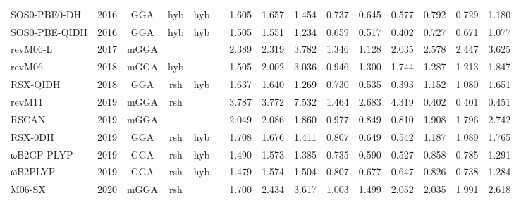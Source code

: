 \begin{landscape}
\begin{longtable}{lcccccrrrrrrrrr}
    SOS0-PBE0-DH     & 2016 & GGA  & hyb      & hyb         &           & 1.605             & 1.657             & 1.454  & 0.737              & 0.645             & 0.577  & 0.792   & 0.729 & 1.180 \\
    SOS0-PBE-QIDH    & 2016 & GGA  & hyb      & hyb         &           & 1.505             & 1.551             & 1.234  & 0.659              & 0.517             & 0.402  & 0.727   & 0.671 & 1.077 \\
    revM06-L         & 2017 & mGGA &          &             &           & 2.389             & 2.319             & 3.782  & 1.346              & 1.128             & 2.035  & 2.578   & 2.447 & 3.625 \\
    revM06           & 2018 & mGGA & hyb      &             &           & 1.505             & 2.002             & 3.036  & 0.946              & 1.300             & 1.744  & 1.287   & 1.213 & 1.847 \\
    RSX-QIDH         & 2018 & GGA  & rsh      & hyb         &           & 1.637             & 1.640             & 1.269  & 0.730              & 0.535             & 0.393  & 1.152   & 1.080 & 1.651 \\
    revM11           & 2019 & mGGA & rsh      &             &           & 3.787             & 3.772             & 7.532  & 1.464              & 2.683             & 4.319  & 0.402   & 0.401 & 0.451 \\
    RSCAN            & 2019 & mGGA &          &             &           & 2.049             & 2.086             & 1.860  & 0.977              & 0.849             & 0.810  & 1.908   & 1.796 & 2.742 \\
    RSX-0DH          & 2019 & GGA  & rsh      & hyb         &           & 1.708             & 1.676             & 1.411  & 0.807              & 0.649             & 0.542  & 1.187   & 1.089 & 1.765 \\
    ωB2GP-PLYP       & 2019 & GGA  & rsh      & hyb         &           & 1.490             & 1.573             & 1.385  & 0.735              & 0.590             & 0.527  & 0.858   & 0.785 & 1.291 \\
    ωB2PLYP          & 2019 & GGA  & rsh      & hyb         &           & 1.479             & 1.574             & 1.504  & 0.807              & 0.677             & 0.647  & 0.826   & 0.738 & 1.284 \\
    M06-SX           & 2020 & mGGA & rsh      &             &           & 1.700             & 2.434             & 3.617  & 1.003              & 1.499             & 2.052  & 2.035   & 1.991 & 2.618 \\

\end{longtable}
\end{landscape}
